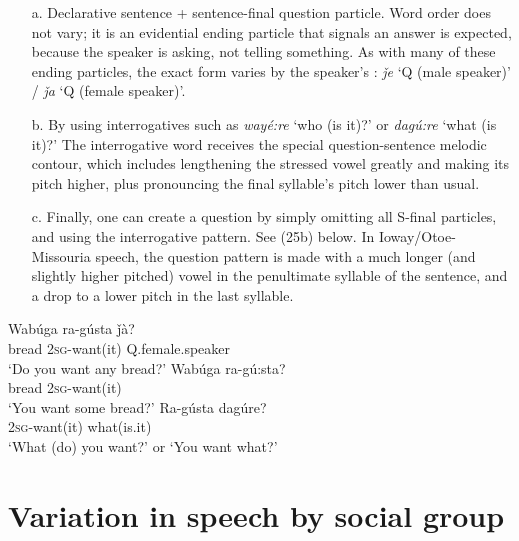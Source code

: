 \documentclass[output=paper]{LSP/langsci}
\begin{document}
\begin{itemize}
\item[a.] Declarative sentence + sentence-final question particle. Word order does not vary; it is an evidential ending particle that signals an answer is expected, because the speaker is asking, not telling something.  As with many of these ending particles, the exact form varies by the speaker's : \textit{\v{j}e} `Q (male speaker)' / \textit{\v{j}a} `Q (female speaker)'. 

\item[b.]  By using interrogatives such as \textit{wayé:re} `who (is it)?' or \textit{dagú:re} `what (is it)?' The interrogative word receives the special question-sentence melodic contour, which includes lengthening the stressed vowel greatly and making its pitch higher, plus pronouncing the final syllable's pitch lower than usual.  	

\item[c.]  Finally, one can create a question by simply omitting all S-final particles, and using the interrogative  pattern. See (25b) below.  In Ioway/Otoe-Missouria speech, the question pattern is made with a much longer (and slightly higher pitched) vowel in the penultimate syllable of the sentence, and a drop to a lower pitch in the last syllable.	
\end{itemize}
\begin{exe}
\ex
\begin{xlist}	       		          	     
\ex \gll Wabúga ra-gústa       \v{j}à?  \\						 	      		
bread       2\textsc{sg}-want(it) Q.female.speaker \\					     		
\trans `Do you want any bread?' 
\ex \gll Wabúga ra-gú:sta? \\					 	 	         		
bread        2\textsc{sg}-want(it) \\			     	     		
\trans `You want some bread?'	
\ex \gll Ra-gústa    dagúre?  \\							        		
2\textsc{sg}-want(it) what(is.it) \\				                    		 	
\trans `What (do) you want?' or `You want what?'
\end{xlist}
\end{exe}

\section{Variation in speech by social group}
\end{document}

